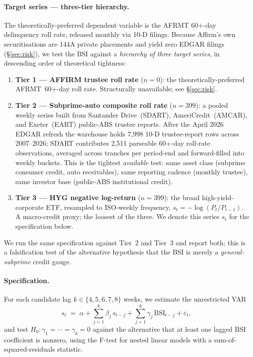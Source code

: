 \documentclass[11pt,letterpaper]{article}
\newcommand{\bsi}{\text{BSI}}
\begin{document}
\paragraph{Target series — three-tier hierarchy.}
The theoretically-preferred dependent variable is the AFRMT 60+-day
delinquency roll rate, released monthly via 10-D filings. Because
Affirm's own securitisations are 144A private placements and yield
zero EDGAR filings (\S\ref{sec:risk}), we test the $\bsi$ against a
\emph{hierarchy of three target series}, in descending order of
theoretical tightness:
\begin{enumerate}[leftmargin=*,itemsep=2pt]
\item \textbf{Tier 1 --- AFFIRM trustee roll rate} ($n=0$): the
  theoretically-preferred AFRMT~60+-day roll rate. Structurally
  unavailable; see \S\ref{sec:risk}.
\item \textbf{Tier 2 --- Subprime-auto composite roll rate}
  ($n=399$): a pooled weekly series built from Santander
  Drive~(SDART), AmeriCredit~(AMCAR), and Exeter~(EART) public-ABS
  trustee reports. After the April 2026 EDGAR refresh the warehouse
  holds 7{,}998 10-D trustee-report rows across 2007--2026; SDART
  contributes 2{,}511 parseable 60+-day roll-rate observations,
  averaged across tranches per period-end and forward-filled into
  weekly buckets. This is the tightest \emph{available} test: same
  asset class (subprime consumer credit, auto receivables), same
  reporting cadence (monthly trustee), same investor base (public-ABS
  institutional credit).
\item \textbf{Tier 3 --- HYG negative log-return} ($n=399$): the
  broad high-yield-corporate ETF, resampled to ISO-weekly frequency,
  $s_t = -\log(P_t / P_{t-1})$. A macro-credit proxy; the loosest
  of the three. We denote this series $s_t$ for the specification
  below.
\end{enumerate}
We run the same specification against Tier~2 and Tier~3 and report
both; this is a falsification test of the alternative hypothesis
that the BSI is merely a \emph{general-subprime} credit gauge.

\paragraph{Specification.}
For each candidate lag $k \in \{4, 5, 6, 7, 8\}$ weeks, we estimate
the unrestricted VAR
%
\begin{equation}
s_t
\;=\;
\alpha
+ \sum_{j=1}^{k} \beta_j\, s_{t-j}
+ \sum_{j=1}^{k} \gamma_j\, \bsi_{t-j}
+ \varepsilon_t,
\label{eq:var}
\end{equation}
%
and test $H_0: \gamma_1 = \cdots = \gamma_k = 0$ against the
alternative that at least one lagged $\bsi$ coefficient is nonzero,
using the F-test for nested linear models with a sum-of-squared-residuals
statistic.
\end{document}
